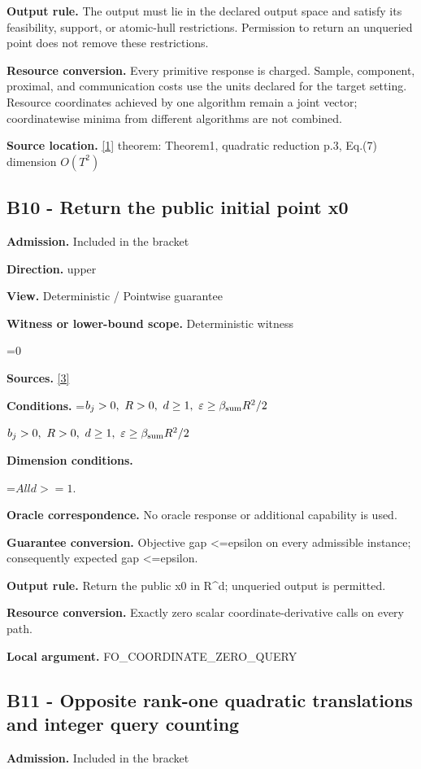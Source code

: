 \documentclass[10pt,a4paper]{article}
\newcommand{\AtlasMath}[1]{\par\begingroup\centering\setbox0=\hbox{$\displaystyle #1$}\ifdim\wd0>1.4\linewidth\typeout{ATLAS WIDE FORMULA: \the\wd0}\fi\ifdim\wd0>\linewidth\resizebox{\linewidth}{!}{\box0}\else\box0\fi\par\endgroup}
\newcommand{\AtlasInlineMath}[1]{\begingroup\setbox0=\hbox{$#1$}\ifdim\wd0>.4\linewidth\endgroup\AtlasMath{#1}\else\endgroup$#1$\fi}
\begin{document}
\textbf{Output rule.} The output must lie in the declared output space and satisfy its feasibility, support, or atomic-hull restrictions. Permission to return an unqueried point does not remove these restrictions.

\textbf{Resource conversion.} Every primitive response is charged. Sample, component, proximal, and communication costs use the units declared for the target setting. Resource coordinates achieved by one algorithm remain a joint vector; coordinatewise minima from different algorithms are not combined.

\textbf{Source location.} \href{https://arxiv.org/pdf/2609.10874}{[1]} theorem: Theorem1, quadratic reduction p.3, Eq.(7) dimension $O(T^2)$

\subsection{B10 - Return the public initial point x0}
\textbf{Admission.} Included in the bracket

\textbf{Direction.} upper

\textbf{View.} Deterministic / Pointwise guarantee

\textbf{Witness or lower-bound scope.} Deterministic witness

\AtlasMath{0}
\textbf{Sources.} \href{https://arxiv.org/pdf/1405.4980}{[3]}

\textbf{Conditions.} \AtlasInlineMath{b_j>0,\ R>0,\ d\ge1,\ \varepsilon\ge\beta_{\rm sum}R^2/2}

\textbf{Dimension conditions.}

\AtlasMath{All d>=1.}
\textbf{Oracle correspondence.} No oracle response or additional capability is used.

\textbf{Guarantee conversion.} Objective gap <=epsilon on every admissible instance; consequently expected gap <=epsilon.

\textbf{Output rule.} Return the public x0 in R\textasciicircum{}d; unqueried output is permitted.

\textbf{Resource conversion.} Exactly zero scalar coordinate-derivative calls on every path.

\textbf{Local argument.} FO\_\allowbreak{}COORDINATE\_\allowbreak{}ZERO\_\allowbreak{}QUERY

\subsection{B11 - Opposite rank-one quadratic translations and integer query counting}
\textbf{Admission.} Included in the bracket
\end{document}
